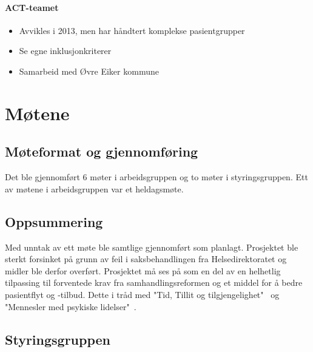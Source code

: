 \documentclass[11pt]{report} %
\begin{document}
                        \subsubsection{ACT-teamet}\label{sec:org_kdps_act}
                          \begin{itemize}
                            \item Avvikles i 2013, men har håndtert komplekse pasientgrupper\\
                            \item Se egne inklusjonkriterer\\
                            \item Samarbeid med Øvre Eiker kommune\\
                          \end{itemize}  
                        
              \chapter{Møtene}\label{chap:m_main}
                \section{Møteformat og gjennomføring}\label{sec:m_form}
                  Det ble gjennomført 6 møter i arbeidsgruppen og to møter i styringsgruppen. Ett av møtene i arbeidsgruppen var et heldagsmøte.
                \section{Oppsummering}\label{sec:m_sum}  
                  Med unntak av ett møte ble samtlige gjennomført som planlagt. Prosjektet ble sterkt forsinket på grunn av feil i saksbehandlingen fra Helsedirektoratet og midler ble derfor overført. Prosjektet må ses på som en del av en helhetlig tilpassing til forventede krav fra samhandlingsreformen og et middel for å bedre pasientflyt og -tilbud. Dette i tråd med "Tid, Tillit og tilgjengelighet"~\cite{tid_til_tilgj} og "Mennesler med psykiske lidelser"~\cite{m_psyk_lid}.
                \section{Styringsgruppen}\label{sec:m_stygr}
\end{document}
